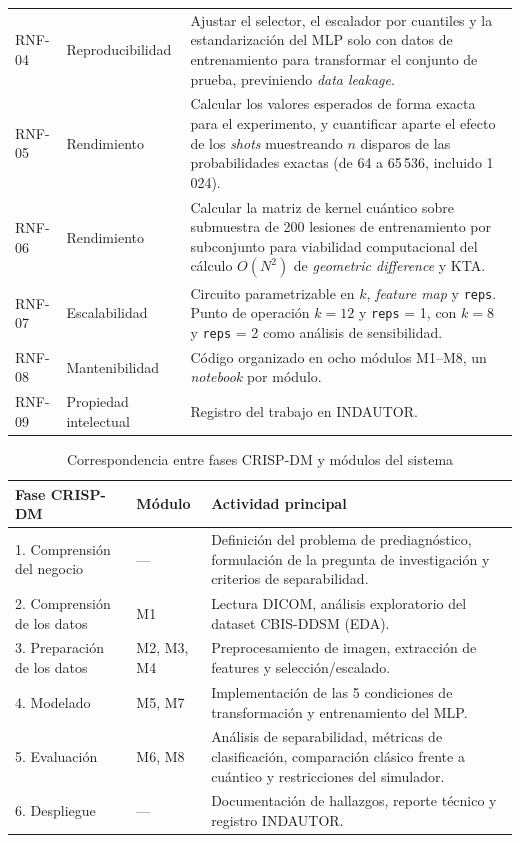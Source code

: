 \begin{longtable}{@{}llp{9.5cm}@{}}
RNF-04 & Reproducibilidad &
Ajustar el selector, el escalador por cuantiles y la
estandarización del MLP solo con datos de entrenamiento para
transformar el conjunto de prueba, previniendo \textit{data leakage}. \\

RNF-05 & Rendimiento &
Calcular los valores esperados de forma exacta para el
experimento, y cuantificar aparte el efecto de los
\textit{shots} muestreando $n$ disparos de las probabilidades
exactas (de 64 a 65\,536, incluido 1\,024). \\

RNF-06 & Rendimiento &
Calcular la matriz de kernel cuántico sobre submuestra de
200 lesiones de entrenamiento por subconjunto para viabilidad
computacional del cálculo $O(N^2)$ de \textit{geometric difference}
y KTA. \\

RNF-07 & Escalabilidad &
Circuito parametrizable en $k$, \textit{feature map} y
\texttt{reps}. Punto de operación $k = 12$ y \texttt{reps} = 1,
con $k = 8$ y \texttt{reps} = 2 como análisis de sensibilidad. \\

RNF-08 & Mantenibilidad &
Código organizado en ocho módulos M1--M8, un \textit{notebook}
por módulo. \\

RNF-09 & Propiedad intelectual &
Registro del trabajo en INDAUTOR. \\

\end{longtable}
\endgroup

\begin{table}[H]
\centering
\caption{Correspondencia entre fases CRISP-DM y módulos
         del sistema}
\label{tab:crisp_modulos}
\renewcommand{\arraystretch}{1.3}
\begin{tabularx}{\textwidth}{@{}llX@{}}
\toprule
\textbf{Fase CRISP-DM} & \textbf{Módulo} &
\textbf{Actividad principal} \\
\midrule
1. Comprensión del negocio  &
  ---   &
  Definición del problema de prediagnóstico,
  formulación de la pregunta de investigación
  y criterios de separabilidad. \\
2. Comprensión de los datos &
  M1    &
  Lectura DICOM, análisis exploratorio del
  dataset CBIS-DDSM (EDA). \\
3. Preparación de los datos &
  M2, M3, M4 &
  Preprocesamiento de imagen, extracción de
  features y selección/escalado. \\
4. Modelado &
  M5, M7 &
  Implementación de las 5 condiciones de
  transformación y entrenamiento del MLP. \\
5. Evaluación &
  M6, M8 &
  Análisis de separabilidad, métricas de
  clasificación, comparación clásico frente a
  cuántico y restricciones del simulador. \\
6. Despliegue &
  ---   &
  Documentación de hallazgos, reporte técnico
  y registro INDAUTOR. \\
\bottomrule
\end{tabularx}
\end{table}
